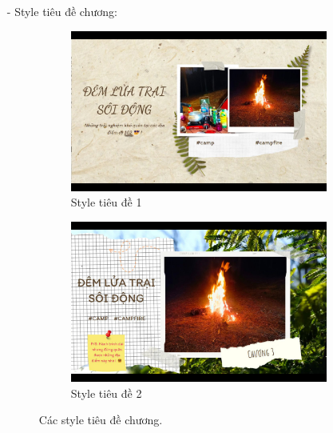 \begin{enumerate}
    \begin{itemize}
        \item[-] Style tiêu đề chương:
        \begin{figure}[H]
            \centering
            \begin{subfigure}{0.48\textwidth}
                \includegraphics[width=1\linewidth]{figures/c4/4_1/title_1.jpg} 
                \caption{Style tiêu đề 1}
            \end{subfigure}
            \hfill
            \begin{subfigure}{0.48\textwidth}
                \includegraphics[width=1\linewidth]{figures/c4/4_1/title_2.jpg} 
                \caption{Style tiêu đề 2}
            \end{subfigure}
            \caption{Các style tiêu đề chương.}
            \label{fig:chapter-title-styles}
        \end{figure}
        

\end{itemize}
\end{enumerate}
